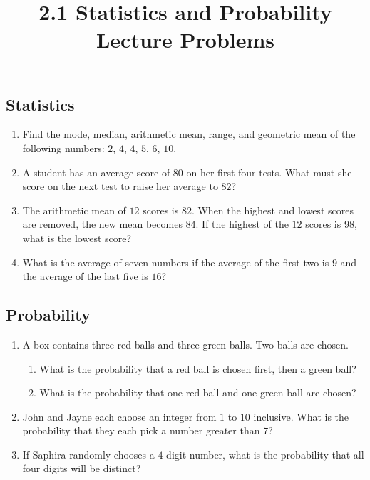 \documentclass{article}
\title{2.1 Statistics and Probability Lecture Problems}
\author{}
\date{}
\begin{document}
\maketitle

\subsection*{Statistics}
\begin{enumerate}
	\item Find the mode, median, arithmetic mean, range, and geometric mean of the following numbers: $2$, $4$, $4$, $5$, $6$, $10$.
		\vspace{3cm}
	\item A student has an average score of $80$ on her first four tests.
		What must she score on the next test to raise her average to $82$?
		\vspace{3cm}
	\item The arithmetic mean of $12$ scores is $82$. When the highest and lowest scores are removed, the new mean becomes $84$.
		If the highest of the $12$ scores is $98$, what is the lowest score?
		\vspace{3cm}
	\item What is the average of seven numbers if the average of the first two is $9$ and the average of the last five is $16$?
		\vspace{3cm}
\end{enumerate}

\newpage

\subsection*{Probability}
\begin{enumerate}[resume]
	\item A box contains three red balls and three green balls. Two balls
		are chosen.
		\begin{enumerate}
			\item What is the probability that a red ball is chosen first, then a green ball?
				\vspace{3cm}
			\item What is the probability that one red ball and one green ball are chosen?
				\vspace{3cm}
		\end{enumerate}
	\item John and Jayne each choose an integer from $1$ to $10$ inclusive.
		What is the probability that they each pick a number greater than $7$?
		\vspace{3cm}
	\item If Saphira randomly chooses a $4$-digit number, what is the probability that all four digits will be distinct?
\end{enumerate}
\end{document}
